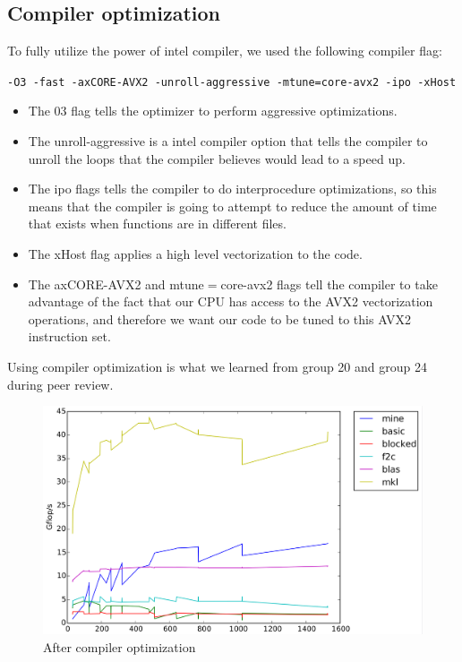 \documentclass[11pt]{article}
\begin{document}
        \clearpage
        
    
                    
        \subsection{Compiler optimization}
        
        \vspace{0.5cm}
        
        To fully utilize the power of intel compiler, we used the following compiler flag:
        \begin{center}
        \texttt{-O3 -fast -axCORE-AVX2 -unroll-aggressive -mtune=core-avx2 -ipo -xHost} 
        \end{center}
        
        \begin{itemize}
            \item The 03 flag tells the optimizer to perform aggressive optimizations.
            \item The unroll-aggressive is a intel compiler option that tells the compiler to unroll the loops that the compiler believes would lead to a speed up. 
            \item The ipo flags tells the compiler to do interprocedure optimizations, so this means that the compiler is going to attempt to reduce the amount of time that exists when functions are in different files.
            \item The xHost flag applies a high level vectorization to the code.
            \item The axCORE-AVX2  and mtune$=$core-avx2 flags tell the compiler to take advantage of the fact that our CPU has access to the AVX2 vectorization operations, and therefore we want our code to be tuned to this AVX2 instruction set. 
        \end{itemize}
        
        Using compiler optimization is what we learned from group 20 and group 24 during peer review.
        
        \vspace{1cm}
        
        \begin{figure}[H]
                \centering
                \includegraphics[width=4.5in]{timing_vector_32_64_cc_cp_align.png}
                \caption{After compiler optimization}
        \end{figure}
        
\end{document}
